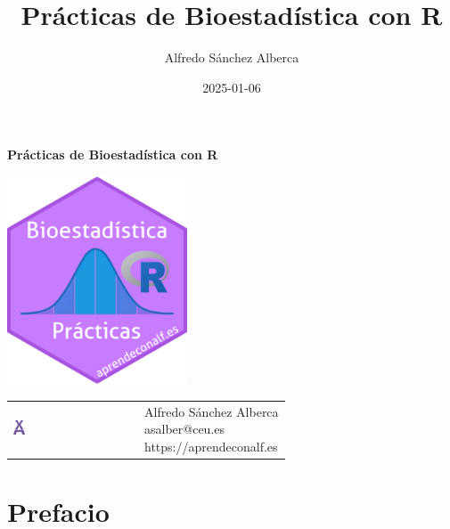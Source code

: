 \documentclass[
  spanish,
  a4paper,
]{scrreport}
\title{Prácticas de Bioestadística con R}
\author{Alfredo Sánchez Alberca}
\date{2025-01-06}
\renewcommand*\contentsname{Tabla de contenidos}
\newcommand\contentsname{Tabla de contenidos}
\theoremstyle{definition}
\theoremstyle{remark}
\begin{document}
\begin{titlepage}

\begin{center}
\vspace*{5cm}

\Huge
{\textbf{\textsf{Prácticas de Bioestadística con R}}}

\vspace{0.5cm}
\LARGE
{\textbf{\textsf{}}}

\vspace{1.5cm}

\includegraphics[width=0.4\textwidth]{img/logos/sticker-bioestadistica-r.png}
\end{center}

\vfill

\begin{flushleft}
\begin{tabular}{ll}
\includegraphics[width=0.1\textwidth]{img/logos/aprendeconalf.png} & \parbox[b]{5cm}{\Large\textsf{Alfredo
Sánchez
Alberca}\\ \textsf{asalber@ceu.es} \\ \textsf{https://aprendeconalf.es}}
\end{tabular}
\end{flushleft}
\end{titlepage}
\renewcommand*\contentsname{Tabla de contenidos}
{
\hypersetup{linkcolor=}
\setcounter{tocdepth}{2}
\tableofcontents
}


\chapter*{Prefacio}\label{prefacio}
\end{document}
